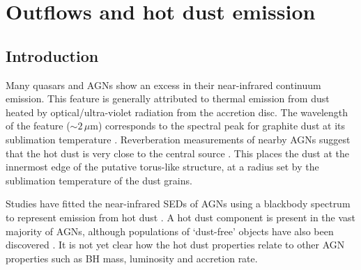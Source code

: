 
\chapter{Outflows and hot dust emission}
\label{ch:sed} 



\section{Introduction}

Many quasars and AGNs show an excess in their near-infrared continuum emission. 
This feature is generally attributed to thermal emission from dust heated by optical/ultra-violet radiation from the accretion disc. 
The wavelength of the feature ($\sim2$\,$\mu$m) corresponds to the spectral peak for graphite dust at its sublimation temperature \citep[${\mathrm T}\sim1500$\,K;][]{barvainis87}. 
Reverberation measurements of nearby AGNs suggest that the hot dust is very close to the central source \citep[few tens of light days; e.g.][]{minezaki04,suganuma06}.
This places the dust at the innermost edge of the putative torus-like structure, at a radius set by the sublimation temperature of the dust grains.  

Studies have fitted the near-infrared SEDs of AGNs using a blackbody spectrum to represent emission from hot dust \citep[e.g.][]{edelson86,barvainis87,kishimoto07,mor09,riffel09,deo11,landt11,mor11,roseboom13}. 
A hot dust component is present in the vast majority of AGNs, although populations of `dust-free' objects have also been discovered \citep{hao10,hao11,jiang10,mor11}. 
It is not yet clear how the hot dust properties relate to other AGN properties such as BH mass, luminosity and accretion rate. 

